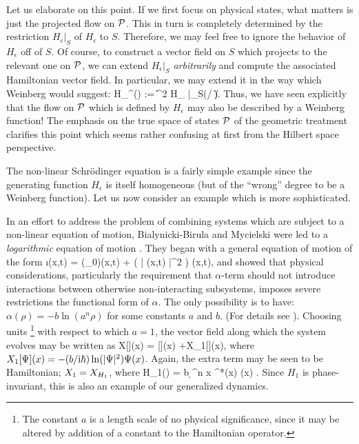 Let us elaborate on this point. If we first focus on physical states,
what matters is just the projected flow on $\P$. This in turn is
completely determined by the restriction $H_\epsilon \big|_S$ of
$H_\epsilon$ to $S$. Therefore, we may feel free to ignore the
behavior of $H_\epsilon$ off of $S$.  Of course, to construct a vector
field on $S$ which projects to the relevant one on $\P$, we can extend
$H_\epsilon \big|_S$ {\em arbitrarily} and compute the associated
Hamiltonian vector field.  In particular, we may extend it in the way
which Weinberg would suggest:
%
\be H_\epsilon^\prime(\Psi) := \| \Psi \|^2 H_\epsilon 
\big|_S(\Psi / \|\Psi\|).  
\ee 
%
Thus, we have seen explicitly that the flow on $\P$ which is defined
by $H_\epsilon$ may also be described by a Weinberg function! The
emphasis on the true space of states $\P$ of the geometric treatment
clarifies this point which seems rather confusing at first from the 
Hilbert space perspective.

The non-linear Schr\"odinger equation is a fairly simple example since
the generating function $H_\epsilon$ is itself homogeneous (but of the
``wrong'' degree to be a Weinberg function).  Let us now consider an
example which is more sophisticated.

In an effort to address the problem of combining systems which are
subject to a non-linear equation of motion, Bialynicki-Birula and
Mycielski were led to a {\em logarithmic} equation of motion
\cite{birula}. They began with a general equation of motion of the
form
%
\be \label{gen_nonlin}
\i\hbar {}(x,t) =
(_0\Psi)(x,t) + \alpha( | \Psi(x,t) |^2 ) \Psi(x,t),
\ee
%
and showed that physical considerations, particularly the requirement
that $\alpha$-term should not introduce interactions between otherwise
non-interacting subsystems, imposes severe restrictions the functional
form of $\alpha$. The only possibility is to have: $\alpha(\rho) = -b
\ln(a^n\rho)$ for some constants $a$ and $b$. (For details see
\cite{birula}).  Choosing units%
%
\footnote{The constant $a$ is a length scale of no physical
significance, since it may be altered by addition of a constant to the
Hamiltonian operator.}
%
with respect to which $a=1$, the vector field along which the system
evolves may be written as 
%
\be X[\Psi](x) = [\Psi](x) +X_1[\Psi](x), \ee 
%
where $X_1[\Psi](x) = -(b/\i\hbar) \ln(|\Psi|^2) \Psi(x)$.  Again, the
extra term may be seen to be Hamiltonian; $X_1 = \hvf{H_1}$, where 
%
\be
H_1(\Psi) = b \int \d^n \! x \Psi^*(x) \Psi(x) .  
\ee
%
Since $H_1$ is phase-invariant, this is also an example of our
generalized dynamics.

